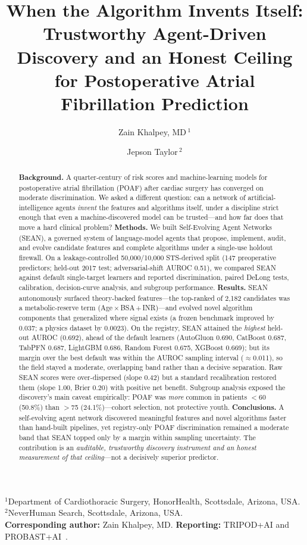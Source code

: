 \documentclass[11pt]{article}
\title{\bfseries When the Algorithm Invents Itself: Trustworthy Agent-Driven
Discovery and an Honest Ceiling for Postoperative Atrial Fibrillation Prediction}
\author{Zain Khalpey, MD\,$^{1}$ \and Jepson Taylor\,$^{2}$}
\date{}
\newcommand{\sean}{SEAN}
\begin{document}
\maketitle

\noindent\small
$^{1}$Department of Cardiothoracic Surgery, HonorHealth, Scottsdale, Arizona, USA.\quad
$^{2}$NeverHuman Search, Scottsdale, Arizona, USA.\\
\textbf{Corresponding author:} Zain Khalpey, MD.\quad
\textbf{Reporting:} TRIPOD+AI and PROBAST+AI~\cite{collins2024,wolff2019,moons2025}.
\normalsize

\begin{abstract}
\noindent
\textbf{Background.} A quarter-century of risk scores and machine-learning models for
postoperative atrial fibrillation (POAF) after cardiac surgery has converged on moderate
discrimination. We asked a different question: can a network of artificial-intelligence
agents \emph{invent} the features and algorithms itself, under a discipline strict enough
that even a machine-discovered model can be trusted---and how far does that move a hard
clinical problem?
\textbf{Methods.} We built Self-Evolving Agent Networks (\sean{}), a governed system of
language-model agents that propose, implement, audit, and evolve candidate features and
complete algorithms under a single-use holdout firewall. On a leakage-controlled
50{,}000/10{,}000 STS-derived split (147 preoperative predictors; held-out 2017 test;
adversarial-shift AUROC 0.51), we compared \sean{} against default single-target learners
and reported discrimination, paired DeLong tests, calibration, decision-curve analysis, and
subgroup performance.
\textbf{Results.} \sean{} autonomously surfaced theory-backed features---the top-ranked of
2{,}182 candidates was a metabolic-reserve term (Age\,$\times$\,BSA\,$+$\,INR)---and evolved
novel algorithm components that generalized where signal exists (a frozen benchmark improved
by 0.037; a physics dataset by 0.0023). On the registry, \sean{} attained the \emph{highest}
held-out AUROC (0.692), ahead of the default learners (AutoGluon 0.690, CatBoost 0.687, TabPFN
0.687, LightGBM 0.686, Random Forest 0.675, XGBoost 0.669); but its margin over the best default
was within the
AUROC sampling interval ($\approx$0.011), so the field stayed a moderate, overlapping band
rather than a decisive separation. Raw \sean{} scores were over-dispersed (slope 0.42) but a standard recalibration
restored them (slope 1.00, Brier 0.20) with positive net benefit. Subgroup analysis exposed
the discovery's main caveat empirically: POAF was \emph{more} common in patients $<$60
(50.8\%) than $>$75 (24.1\%)---cohort selection, not protective youth.
\textbf{Conclusions.} A self-evolving agent network discovered meaningful features and novel
algorithms faster than hand-built pipelines, yet registry-only POAF discrimination remained a
moderate band that \sean{} topped only by a margin within sampling uncertainty. The
contribution is an \emph{auditable, trustworthy discovery instrument and an honest measurement
of that ceiling}---not a decisively superior predictor.
\end{abstract}
\end{document}
